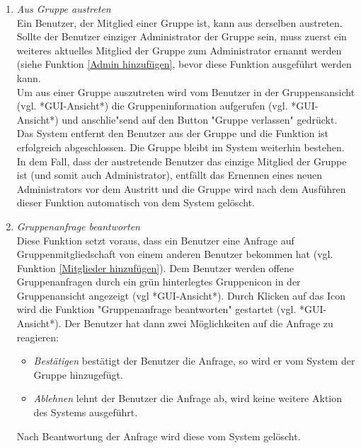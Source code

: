 \documentclass[parskip=full]{scrartcl}
\def\threedigits#1{%
  \ifnum#1<100 0\fi
  \ifnum#1<10 0\fi
  \number#1}
\begin{document}
\begin{enumerate}[label={\textbf{/F\protect\threedigits{\theenumi}0/}}, leftmargin=*, resume]
	\item \textit{Aus Gruppe austreten}\\
	Ein \gls{Benutzer}, der Mitglied einer Gruppe ist, kann aus derselben austreten. Sollte der Benutzer einziger Administrator der Gruppe sein, muss zuerst ein weiteres aktuelles Mitglied der Gruppe zum Administrator ernannt werden (siehe Funktion \ref{Admin hinzufügen}, bevor diese Funktion ausgeführt werden kann. \\
	Um aus einer Gruppe auszutreten wird vom Benutzer in der Gruppensansicht (vgl. *GUI-Ansicht*) die Gruppeninformation aufgerufen (vgl. *GUI-Ansicht*) und anschlie"send auf den Button "Gruppe verlassen" gedrückt. Das System entfernt den Benutzer aus der Gruppe und die Funktion ist erfolgreich abgeschlossen. Die Gruppe bleibt im System weiterhin bestehen.\\
	In dem Fall, dass der austretende Benutzer das einzige Mitglied der Gruppe ist (und somit auch Administrator), entfällt das Ernennen eines neuen Administrators vor dem Austritt und die Gruppe wird nach dem Ausführen dieser Funktion automatisch von dem System gelöscht.
	
	\item \textit{Gruppenanfrage beantworten} \label{Gruppenanfrage beantworten} \\
	Diese Funktion setzt voraus, dass ein Benutzer eine Anfrage auf Gruppenmitgliedschaft von einem anderen Benutzer bekommen hat (vgl. Funktion \ref{Mitglieder hinzufügen}). Dem Benutzer werden offene Gruppenanfragen durch ein grün hinterlegtes Gruppenicon in der Gruppenansicht angezeigt (vgl *GUI-Ansicht*). Durch Klicken auf das Icon wird die Funktion "Gruppenanfrage beantworten" gestartet (vgl. *GUI-Ansicht*). Der Benutzer hat dann zwei Möglichkeiten auf die Anfrage zu reagieren:
	\begin{itemize}
		\item \textit{Bestätigen} bestätigt der Benutzer die Anfrage, so wird er vom System der Gruppe hinzugefügt.
		\item \textit{Ablehnen} lehnt der Benutzer die Anfrage ab, wird keine weitere Aktion des Systems ausgeführt.
	\end{itemize}
Nach Beantwortung der Anfrage wird diese vom System gelöscht.
\end{enumerate}
\end{document}
